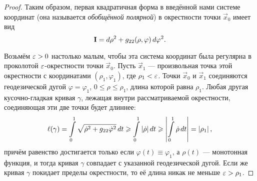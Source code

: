 \begin{proof}
	Таким образом, первая квадратичная форма в введённой нами системе координат (она называется \textit{обобщённой полярной}) в окрестности точки $\vec{x}_0$ имеет вид
	\[
		\boldsymbol{\operatorname{I}} = d\rho^2 + g_{22}(\rho, \varphi)\,d\varphi^2.
	\]

	Возьмём $\varepsilon > 0$ настолько малым, чтобы эта система координат была регулярна в проколотой $\varepsilon$-окрестности точки $\vec{x}_0$. Пусть $\vec{x}_1$ --- произвольная точка этой окрестности с координатами $(\rho_1, \varphi_1)$, где $\rho_1 < \varepsilon$. Точки $\vec{x}_0$ и $\vec{x}_1$ соединяются геодезической дугой $\varphi = \varphi_1$, $0 \leqslant \rho \leqslant \rho_1$, длина которой равна $\rho_1$. Любая другая кусочно-гладкая кривая $\gamma$, лежащая внутри рассматриваемой окрестности, соединяющая эти две точки будет длиннее:
	\[
		\ell(\gamma) = \int\limits_0^1\sqrt{\dot{\rho}^2 + g_{22}\dot{\varphi}^2}\,dt \geqslant \int\limits_0^1\left\lvert\dot{\rho}\right\rvert dt \geqslant \left\lvert\int\limits_0^1\dot{\rho}\,dt\right\rvert = \left\lvert\rho_1\right\rvert,
	\]
	причём равенство достигается только если $\varphi(t) \equiv \varphi_1$, а $\rho(t)$ --- монотонная функция, и тогда кривая $\gamma$ совпадает с указанной геодезической дугой. Если же кривая $\gamma$ покидает пределы окрестности, то её длина никак не меньше $\varepsilon > \rho_1$.
\end{proof}

